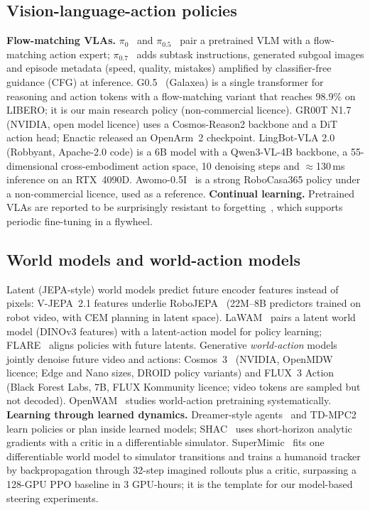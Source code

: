 \documentclass[10pt,a4paper]{article}
\newcommand{\pz}{$\pi_{0}$}
\newcommand{\pzf}{$\pi_{0.5}$}
\newcommand{\pzs}{$\pi_{0.7}$}
\begin{document}
\subsection{Vision-language-action policies}
\textbf{Flow-matching VLAs.} \pz~\cite{pi0} and \pzf~\cite{pi05} pair a pretrained VLM with a flow-matching action expert; \pzs~\cite{pi07} adds subtask instructions, generated subgoal images and episode metadata (speed, quality, mistakes) amplified by classifier-free guidance (CFG) at inference. G0.5~\cite{g05} (Galaxea) is a single transformer for reasoning and action tokens with a flow-matching variant that reaches 98.9\% on LIBERO; it is our main research policy (non-commercial licence). GR00T N1.7~\cite{gr00t} (NVIDIA, open model licence) uses a Cosmos-Reason2 backbone and a DiT action head; Enactic released an OpenArm~2 checkpoint. LingBot-VLA 2.0~\cite{lingbot2} (Robbyant, Apache-2.0 code) is a 6B model with a Qwen3-VL-4B backbone, a 55-dimensional cross-embodiment action space, 10 denoising steps and $\approx$130\,ms inference on an RTX~4090D. Awomo-0.5I~\cite{awomo} is a strong RoboCasa365 policy under a non-commercial licence, used as a reference.
\textbf{Continual learning.} Pretrained VLAs are reported to be surprisingly resistant to forgetting~\cite{vla_forget}, which supports periodic fine-tuning in a flywheel.

\subsection{World models and world-action models}
Latent (JEPA-style) world models predict future encoder features instead of pixels: V-JEPA~2.1 features underlie RoboJEPA~\cite{robojepa} (22M--8B predictors trained on robot video, with CEM planning in latent space). LaWAM~\cite{lawam} pairs a latent world model (DINOv3 features) with a latent-action model for policy learning; FLARE~\cite{flare} aligns policies with future latents. Generative \emph{world-action} models jointly denoise future video and actions: Cosmos~3~\cite{cosmos3} (NVIDIA, OpenMDW licence; Edge and Nano sizes, DROID policy variants) and FLUX~3 Action~\cite{flux3a} (Black Forest Labs, 7B, FLUX Kommunity licence; video tokens are sampled but not decoded). OpenWAM~\cite{openwam} studies world-action pretraining systematically.
\textbf{Learning through learned dynamics.} Dreamer-style agents~\cite{dreamerv3} and TD-MPC2~\cite{tdmpc2} learn policies or plan inside learned models; SHAC~\cite{shac} uses short-horizon analytic gradients with a critic in a differentiable simulator. SuperMimic~\cite{supermimic} fits one differentiable world model to simulator transitions and trains a humanoid tracker by backpropagation through 32-step imagined rollouts plus a critic, surpassing a 128-GPU PPO baseline in 3 GPU-hours; it is the template for our model-based steering experiments.
\end{document}
